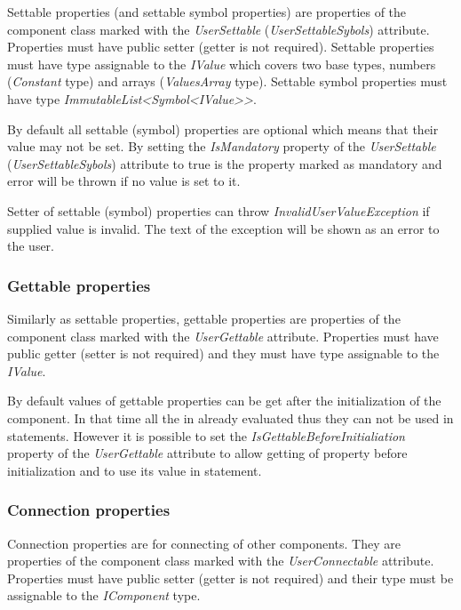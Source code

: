 Settable properties (and settable symbol properties) are properties of the component class marked with the \emph{UserSettable} (\emph{UserSettableSybols}) attribute.
Properties must have public setter (getter is not required).
Settable properties must have type assignable to the \emph{IValue} which covers two base types, numbers (\emph{Constant} type) and arrays (\emph{ValuesArray} type).
Settable symbol properties must have type \emph{ImmutableList<Symbol<IValue>{}>}.

By default all settable (symbol) properties are optional which means that their value may not be set.
By setting the \emph{IsMandatory} property of the \emph{UserSettable} (\emph{UserSettableSybols}) attribute to true is the property marked as mandatory and error will be thrown if no value is set to it.

Setter of settable (symbol) properties can throw \emph{InvalidUserValueException} if supplied value is invalid.
The text of the exception will be shown as an error to the user.



\subsubsection{Gettable properties}

Similarly as settable properties, gettable properties are properties of the component class marked with the \emph{UserGettable} attribute.
Properties must have public getter (setter is not required) and they must have type assignable to the \emph{IValue}.

By default values of gettable properties can be get after the initialization of the component.
In that time all the \lsystem in already evaluated thus they can not be used in \lsystem statements.
However it is possible to set the \emph{IsGettableBeforeInitialiation} property of the \emph{UserGettable} attribute to allow getting of property before initialization and to use its value in \lsystem statement.


\subsubsection{Connection properties}

Connection properties are for connecting of other components.
They are properties of the component class marked with the \emph{UserConnectable} attribute.
Properties must have public setter (getter is not required) and their type must be assignable to the \emph{IComponent} type.

